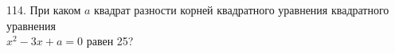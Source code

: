 114. При каком $a$ квадрат разности корней квадратного уравнения квадратного уравнения\\ $x^2-3x+a=0$ равен 25?\\
